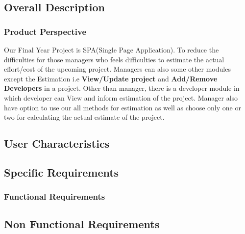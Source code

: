 \subsection{Overall Description}
\subsubsection{Product Perspective}
Our Final Year Project is SPA(Single Page Application). To reduce the difficulties for those managers who feels 
difficulties to estimate the actual effort/cost of the upcoming project. Managers can also some other modules except
the Estimation i.e {\bfseries View/Update project} and {\bfseries Add/Remove Developers} in a project. Other than manager, there is a developer module in which developer 
can View and inform estimation of the project. Manager also have option to use our all methods for estimation as well as choose only one or two for calculating the actual estimate of the project.

    
\subsection{User Characteristics}
\blindtext[2]

\subsection{Specific Requirements}
\blindtext[2]

\subsubsection{Functional Requirements}


\subsection{Non Functional Requirements}


\newpage

